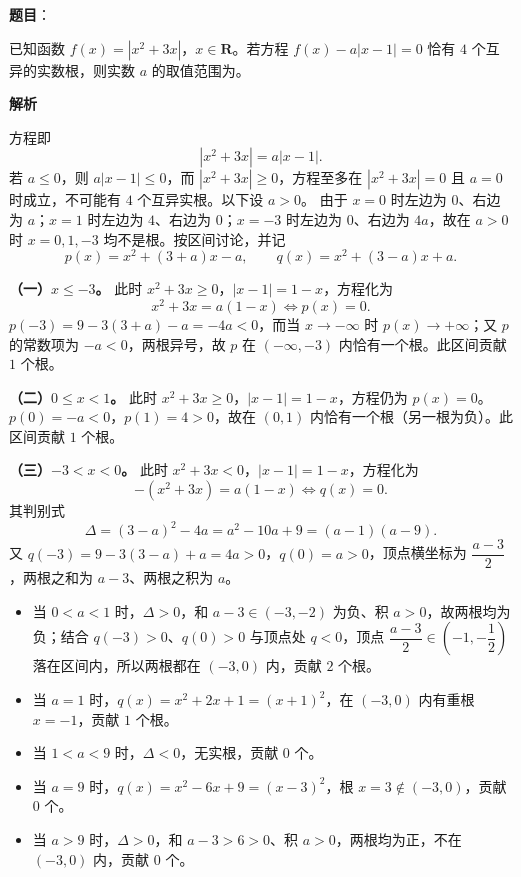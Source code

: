 \begin{answer}

\textbf{题目}：

已知函数 $f(x)=|x^2+3x|$，$x\in\mathbf R$。若方程 $f(x)-a|x-1|=0$ 恰有 $4$ 个互异的实数根，则实数 $a$ 的取值范围为\gkblank{}。

\textbf{解析}

方程即
\nopagebreak[4]
\[|x^2+3x|=a|x-1|.\]
若 $a\leqslant0$，则 $a|x-1|\leqslant0$，而 $|x^2+3x|\geqslant0$，方程至多在 $|x^2+3x|=0$ 且 $a=0$ 时成立，不可能有 $4$ 个互异实根。以下设 $a>0$。
由于 $x=0$ 时左边为 $0$、右边为 $a$；$x=1$ 时左边为 $4$、右边为 $0$；$x=-3$ 时左边为 $0$、右边为 $4a$，故在 $a>0$ 时 $x=0,1,-3$ 均不是根。按区间讨论，并记
\nopagebreak[4]
\[p(x)=x^2+(3+a)x-a,\qquad q(x)=x^2+(3-a)x+a.\]

\textbf{（一）$x\leqslant-3$。} 此时 $x^2+3x\geqslant0$，$|x-1|=1-x$，方程化为
\nopagebreak[4]
\[x^2+3x=a(1-x)\iff p(x)=0.\]
$p(-3)=9-3(3+a)-a=-4a<0$，而当 $x\to-\infty$ 时 $p(x)\to+\infty$；又 $p$ 的常数项为 $-a<0$，两根异号，故 $p$ 在 $(-\infty,-3)$ 内恰有一个根。此区间贡献 $1$ 个根。

\textbf{（二）$0\leqslant x<1$。} 此时 $x^2+3x\geqslant0$，$|x-1|=1-x$，方程仍为 $p(x)=0$。$p(0)=-a<0$，$p(1)=4>0$，故在 $(0,1)$ 内恰有一个根（另一根为负）。此区间贡献 $1$ 个根。

\textbf{（三）$-3<x<0$。} 此时 $x^2+3x<0$，$|x-1|=1-x$，方程化为
\nopagebreak[4]
\[-(x^2+3x)=a(1-x)\iff q(x)=0.\]
其判别式
\nopagebreak[4]
\[\Delta=(3-a)^2-4a=a^2-10a+9=(a-1)(a-9).\]
又 $q(-3)=9-3(3-a)+a=4a>0$，$q(0)=a>0$，顶点横坐标为 $\dfrac{a-3}{2}$，两根之和为 $a-3$、两根之积为 $a$。

\begin{itemize}
\item 当 $0<a<1$ 时，$\Delta>0$，和 $a-3\in(-3,-2)$ 为负、积 $a>0$，故两根均为负；结合 $q(-3)>0$、$q(0)>0$ 与顶点处 $q<0$，顶点 $\dfrac{a-3}{2}\in\left(-1,-\dfrac12\right)$ 落在区间内，所以两根都在 $(-3,0)$ 内，贡献 $2$ 个根。
\item 当 $a=1$ 时，$q(x)=x^2+2x+1=(x+1)^2$，在 $(-3,0)$ 内有重根 $x=-1$，贡献 $1$ 个根。
\item 当 $1<a<9$ 时，$\Delta<0$，无实根，贡献 $0$ 个。
\item 当 $a=9$ 时，$q(x)=x^2-6x+9=(x-3)^2$，根 $x=3\notin(-3,0)$，贡献 $0$ 个。
\item 当 $a>9$ 时，$\Delta>0$，和 $a-3>6>0$、积 $a>0$，两根均为正，不在 $(-3,0)$ 内，贡献 $0$ 个。
\end{itemize}


\end{answer}
